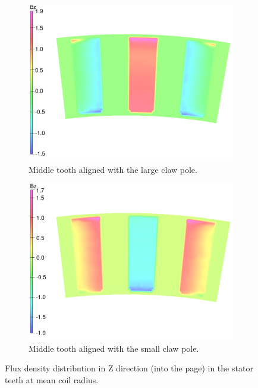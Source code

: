 \documentclass[12pt]{iopart}
\begin{document}
\begin{figure}[]
  \centering
  \begin{subfigure}{.4\columnwidth}
  \includegraphics[]{Bz_0_deg}
  \caption{Middle tooth aligned with the large claw pole.}
  \label{Bz_0_deg}
  \end{subfigure}

  \begin{subfigure}{.4\columnwidth}
  \includegraphics[]{Bz_90_deg}
  \caption{Middle tooth aligned with the small claw pole.}
  \label{Bz_90_deg}
  \end{subfigure}

  \caption{Flux density distribution in Z direction (into the page) in the stator teeth at mean coil radius.} 
  \label{10MW_tooth_Bz}
\end{figure}
\end{document}
